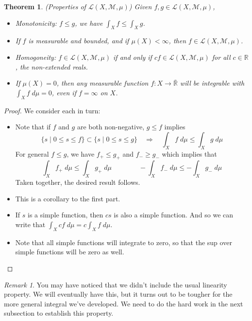 \documentclass[12pt]{article}
\theoremstyle{plain}
\newtheorem{thm}{Theorem}[subsection]
\theoremstyle{definition}
\theoremstyle{remark}
\newtheorem*{rmk}{Remark}
\begin{document}
\begin{thm} \emph{(Properties of $\mathscr{L}(X,\mathscr{M}, \mu)$)} Given $f,g\in\mathscr{L}(X,\mathscr{M},\mu)$,
    
    \begin{itemize}
        \item {Monotonicity}: $f\leq g$, we have $\int_X f \leq\int_X g$.
        \item If $f$ is measurable and bounded, and if $\mu(X)<\infty$, then $f\in\mathscr{L}(X,\mathscr{M},\mu)$.
        \item {Homogoneity}: $f\in\mathscr{L}(X,\mathscr{M},\mu)$ if and only if $cf\in\mathscr{L}(X,\mathscr{M},\mu)$ for all $c\in\mathbb{R}$, the non-extended reals.
        \item If $\mu(X)=0$, then \emph{any} measurable function $f: X\rightarrow\bar{\mathbb{R}}$ will be integrable with $\int_X f \; d\mu=0$, even if $f=\infty$ on $X$.
    \end{itemize}
\end{thm}
\begin{proof} We consider each in turn:
\begin{itemize} 

    \item Note that if $f$ and $g$ are both non-negative, $g\leq f$ implies
\[
    \{ s \; | \; 0\leq s\leq f \} \subset
    \{ s \; | \; 0\leq s\leq g \}  \quad\Rightarrow\quad
    \int_X f \; d\mu \leq
    \int_X g \; d\mu 
\]
For general $f\leq g$, we have $f_+ \leq g_+$ and $f_- \geq g_-$ which implies that 
\[
    \int_X f_+ \; d\mu \leq 
    \int_X g_+ \; d\mu
    \qquad\qquad 
    -\int_X f_- \; d\mu \leq 
    -\int_X g_- \; d\mu
\]
Taken together, the desired result follows.

    \item This is a corollary to the first part.  
        
    \item If $s$ is a simple function, then $cs$ is also a simple function. And so we can write that $\int_X cf \; d\mu = c\int_X f \; d\mu$.
        
    \item Note that all simple functions will integrate to zero, so that the sup over simple functions will be zero as well.
\end{itemize}
\end{proof}

\begin{rmk}
You may have noticed that we didn't include the usual linearity property. We will eventually have this, but it turns out to be tougher for the more general integral we've developed. We need to do the hard work in the next subsection to establish this property.
\end{rmk}
\end{document}
